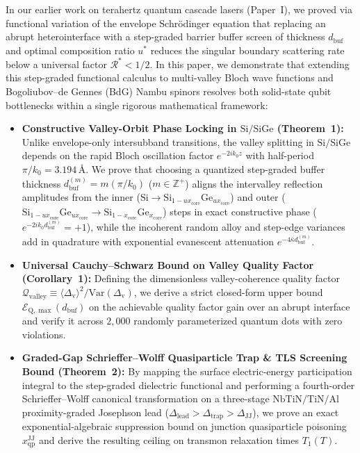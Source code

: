 \documentclass[11pt,letterpaper]{article}
\theoremstyle{definition}
\begin{document}
In our earlier work on terahertz quantum cascade lasers (Paper~I), we proved via functional variation of the envelope Schr\"odinger equation that replacing an abrupt heterointerface with a step-graded barrier buffer screen of thickness $d_{\mathrm{buf}}$ and optimal composition ratio $u^*$ reduces the singular boundary scattering rate below a universal factor $\mathcal{R}^* < 1/2$. In this paper, we demonstrate that extending this step-graded functional calculus to multi-valley Bloch wave functions and Bogoliubov--de Gennes (BdG) Nambu spinors resolves both solid-state qubit bottlenecks within a single rigorous mathematical framework:
\begin{itemize}
  \item \textbf{Constructive Valley-Orbit Phase Locking in $\mathrm{Si/SiGe}$ (Theorem~1):} Unlike envelope-only intersubband transitions, the valley splitting in $\mathrm{Si/SiGe}$ depends on the rapid Bloch oscillation factor $e^{-2i k_0 z}$ with half-period $\pi/k_0 = 3.194\,\text{\AA}$. We prove that choosing a quantized step-graded buffer thickness $d_{\mathrm{buf}}^{(m)} = m(\pi/k_0)$ ($m \in \mathbb{Z}^+$) aligns the intervalley reflection amplitudes from the inner ($\mathrm{Si} \to \mathrm{Si}_{1-u x_{\mathrm{core}}}\mathrm{Ge}_{u x_{\mathrm{core}}}$) and outer ($\mathrm{Si}_{1-u x_{\mathrm{core}}}\mathrm{Ge}_{u x_{\mathrm{core}}} \to \mathrm{Si}_{1-x_{\mathrm{core}}}\mathrm{Ge}_{x_{\mathrm{core}}}$) steps in exact constructive phase ($e^{-2i k_0 d_{\mathrm{buf}}^{(m)}} = +1$), while the incoherent random alloy and step-edge variances add in quadrature with exponential evanescent attenuation $e^{-4\bar{\kappa} d_{\mathrm{buf}}^{(m)}}$.
  \item \textbf{Universal Cauchy--Schwarz Bound on Valley Quality Factor (Corollary~1):} Defining the dimensionless valley-coherence quality factor $\mathcal{Q}_{\mathrm{valley}} \equiv \langle\Delta_{\mathrm{v}}\rangle^2 / \mathrm{Var}(\Delta_{\mathrm{v}})$, we derive a strict closed-form upper bound $\mathcal{E}_{\mathrm{Q},\max}(d_{\mathrm{buf}})$ on the achievable quality factor gain over an abrupt interface and verify it across $2{,}000$ randomly parameterized quantum dots with zero violations.
  \item \textbf{Graded-Gap Schrieffer--Wolff Quasiparticle Trap \& TLS Screening Bound (Theorem~2):} By mapping the surface electric-energy participation integral to the step-graded dielectric functional and performing a fourth-order Schrieffer--Wolff canonical transformation on a three-stage $\mathrm{NbTiN/TiN/Al}$ proximity-graded Josephson lead ($\Delta_{\mathrm{lead}} > \Delta_{\mathrm{trap}} > \Delta_{\mathrm{JJ}}$), we prove an exact exponential-algebraic suppression bound on junction quasiparticle poisoning $x_{\mathrm{qp}}^{\mathrm{JJ}}$ and derive the resulting ceiling on transmon relaxation times $T_1(T)$.
\end{itemize}
\end{document}
